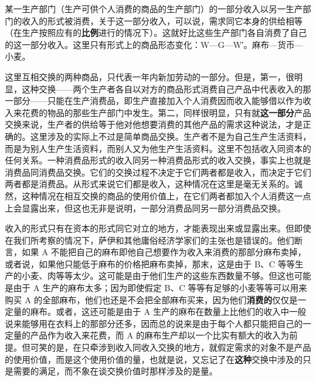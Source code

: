 
某一生产部门（生产可供个人消费的商品的生产部门）的一部分收入以另一生产部门的收入的形式被消费，关于这一部分收入，可以说，需求同它本身的供给相等（在生产按照应有的\textbf{比例}进行的情况下）。这就好比这些生产部门各自消费了自己的这一部分收入。这里只有形式上的商品形态变化：W—G—W′。麻布—货币—小麦。

这里互相交换的两种商品，只代表一年内新加劳动的一部分。但是，第一，很明显，这种交换——两个生产者各自以对方的商品形式消费自己产品中代表收入的那一部分——只能在生产消费品，即生产直接加入个人消费因而收入能够借以作为收入来花费的物品的那些生产部门中发生。第二，同样很明显，只有就\textbf{这一部分}产品交换来说，生产者的供给等于他对他想要消费的其他产品的需求这种说法，才是正确的。这里涉及的实际上不过是简单商品交换。生产者不是为自己生产生活资料，而是为别人生产生活资料，而别人又为他生产生活资料。这里不包括收入同资本的任何关系。一种消费品形式的收入同另一种消费品形式的收入交换，事实上也就是消费品同消费品交换。它们的交换过程不决定于它们两者都是收入，而决定于它们两者都是消费品。从形式来说它们都是收入，这种情况在这里是毫无关系的。诚然，这种情况在相互交换的商品的使用价值上，在它们两者都加入个人消费这一点上会显露出来，但这也无非是说明，一部分消费品同另一部分消费品交换。

收入的形式只有在资本的形式同它对立的地方，才能表现出来或显露出来。但即使在我们所考察的情况下，萨伊和其他庸俗经济学家们的主张也是错误的。他们断言，如果 A 不能把自己的麻布即他自己想要作为收入来消费的那部分麻布卖掉，或者说，如果他只能低于麻布的价格把麻布卖掉，那末，这是由于 B、C 等等生产的小麦、肉等等太少。这可能是由于他们生产的这些东西数量不够。但这也可能是由于 A 生产的麻布太多；因为即使假定 B、C 等等有足够的小麦等等可以用来购买 A 的全部麻布，他们也还是不会把全部麻布买来，因为他们\textbf{消费的}仅仅是一定量的麻布。或者，这还可能是由于 A 生产的麻布在数量上比他们的收入中一般说来能够用在衣料上的那部分还多，因而总的说来是由于每个人都只能把自己的一定量的产品作为收入来花费，而 A 的麻布生产却以一个比实有额大的收入为前提。但可笑的是，在只牵涉到收入同收入交换的地方，就假定需求的对象不是产品的使用价值，而是这个使用价值的量，也就是说，又忘记了在\textbf{这种}交换中涉及的只是需要的满足，而不象在谈交换价值时那样涉及的是量。

